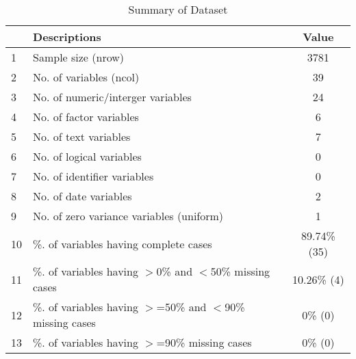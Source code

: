 \begin{table}[ht]
\centering
\caption{Summary of Dataset} 
\begin{tabular}{llc}
  \hline
 & Descriptions & Value \\ 
  \hline
1 & Sample size (nrow) & 3781 \\ 
  2 & No. of variables (ncol) & 39 \\ 
  3 & No. of numeric/interger variables & 24 \\ 
  4 & No. of factor variables & 6 \\ 
  5 & No. of text variables & 7 \\ 
  6 & No. of logical variables & 0 \\ 
  7 & No. of identifier variables & 0 \\ 
  8 & No. of date variables & 2 \\ 
  9 & No. of zero variance variables (uniform) & 1 \\ 
  10 & \%. of variables having complete cases & 89.74\% (35) \\ 
  11 & \%. of variables having $>$0\% and $<$50\% missing cases & 10.26\% (4) \\ 
  12 & \%. of variables having $>$=50\% and $<$90\% missing cases & 0\% (0) \\ 
  13 & \%. of variables having $>$=90\% missing cases & 0\% (0) \\ 
   \hline
\end{tabular}
\end{table}
